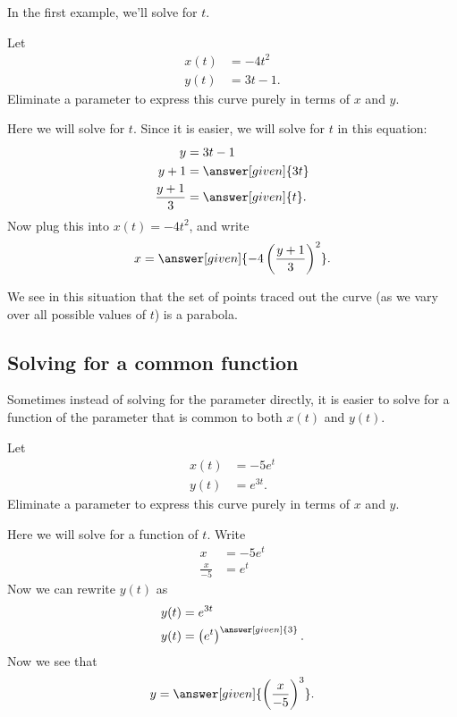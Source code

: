 \documentclass{ximera}
\begin{document}
In the first example, we'll solve for $t$.
\begin{example}
  Let
  \begin{align*}
    x(t) &= -4 t^2\\
    y(t) &= 3t-1.
  \end{align*}
    Eliminate a parameter to express this curve purely in terms of $x$ and $y$.
  \begin{explanation}
    Here we will solve for $t$. Since it is easier, we will solve for
    $t$ in this equation:
    \begin{align*}
      y &= 3t-1\\
      y+1 &= \answer[given]{3t}\\
      \frac{y+1}{3} & = \answer[given]{t}.
    \end{align*}
    Now plug this into $x(t) = -4 t^2$, and write
    \[
    x = \answer[given]{-4 \left(\frac{y+1}{3}\right)^2}.
    \]
  \end{explanation}
\end{example}

We see in this situation that the set of points traced out the curve (as we vary over all possible values of $t$) is a parabola.

\subsection{Solving for a common function}

Sometimes instead of solving for the parameter directly, it is easier to solve for a function of the parameter that is common to both $x(t)$ and $y(t)$.

\begin{example}
  Let
  \begin{align*}
    x(t) &= -5e^t\\
    y(t) &= e^{3t}.
  \end{align*}
    Eliminate a parameter to express this curve purely in terms of $x$
    and $y$.
    \begin{explanation}
      Here we will solve for a function of $t$. Write
      \begin{align*}
        x &= -5e^t\\
        \frac{x}{-5} &= e^t
      \end{align*}
      Now we can rewrite $y(t)$ as
      \begin{align*}
        y(t) &= e^{3t}\\
        y(t) &= \left(e^{t}\right)^{\answer[given]{3}}.
      \end{align*}
      Now we see that
      \[
      y = \answer[given]{\left(\frac{x}{-5}\right)^3}.
      \]
  \end{explanation}
\end{example}
\end{document}
